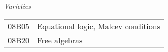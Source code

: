 \vskip1mm


{\it Varieties} \\[4pt]
\begin{tabular}{ll}
\phantom{XX} 08B05   &  Equational logic, Malcev conditions\\
\phantom{XX} 08B20   &  Free algebras\\
\end{tabular}
\vskip1mm

